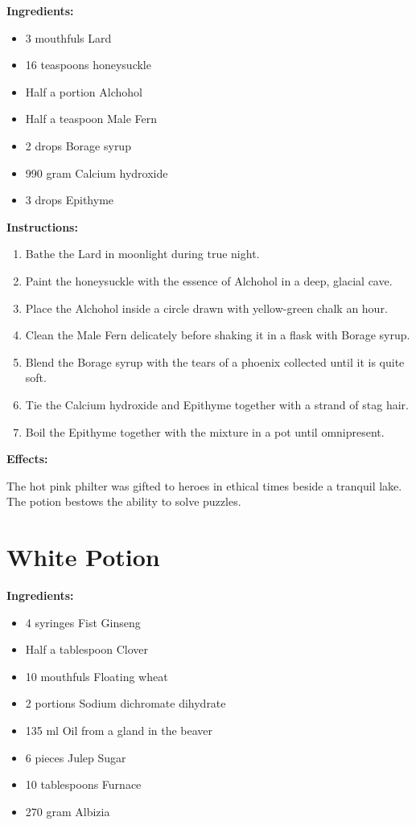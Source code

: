 \documentclass{article}
\begin{document}
\textbf{Ingredients:}

\begin{itemize}
  \item 3 mouthfuls Lard
  \item 16 teaspoons honeysuckle
  \item Half a portion Alchohol
  \item Half a teaspoon Male Fern
  \item 2 drops Borage syrup
  \item 990 gram Calcium hydroxide
  \item 3 drops Epithyme
\end{itemize}

\textbf{Instructions:}

\begin{enumerate}
  \item Bathe the Lard in moonlight during true night.
  \item Paint the honeysuckle with the essence of Alchohol in a deep, glacial cave.
  \item Place the Alchohol inside a circle drawn with yellow-green chalk an hour.
  \item Clean the Male Fern delicately before shaking it in a flask with Borage syrup.
  \item Blend the Borage syrup with the tears of a phoenix collected until it is quite soft.
  \item Tie the Calcium hydroxide and Epithyme together with a strand of stag hair.
  \item Boil the Epithyme together with the mixture in a pot until omnipresent.
\end{enumerate}

\textbf{Effects:}

The hot pink philter was gifted to heroes in ethical times beside a tranquil lake. The potion bestows the ability to solve puzzles.

\newpage
\section*{White Potion}

\textbf{Ingredients:}

\begin{itemize}
  \item 4 syringes Fist Ginseng
  \item Half a tablespoon Clover
  \item 10 mouthfuls Floating wheat
  \item 2 portions Sodium dichromate dihydrate
  \item 135 ml Oil from a gland in the beaver
  \item 6 pieces Julep Sugar
  \item 10 tablespoons Furnace
  \item 270 gram Albizia
\end{itemize}
\end{document}

